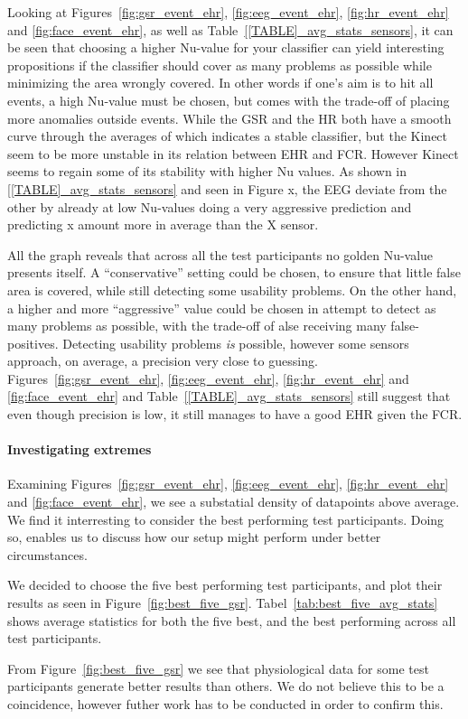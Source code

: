 Looking at Figures~\ref{fig:gsr_event_ehr}, \ref{fig:eeg_event_ehr}, \ref{fig:hr_event_ehr} and \ref{fig:face_event_ehr},
as well as Table~\ref{[TABLE]_avg_stats_sensors}, it can be seen that choosing a higher Nu-value for your classifier can yield interesting propositions if the classifier should cover as many problems as possible while minimizing the area wrongly covered.
In other words if one's aim is to hit all events, a high Nu-value must be chosen, but comes with the trade-off of placing more anomalies outside events. 
While the GSR and the HR both have a smooth curve through the averages of which indicates a stable classifier, but the Kinect seem to be more unstable in its relation between EHR and FCR. However Kinect seems to regain some of its stability with higher Nu values. As shown in \ref{[TABLE]_avg_stats_sensors} and seen in Figure x, the EEG deviate from the other by already at low Nu-values doing a very aggressive prediction and predicting x amount more in average than the X sensor.

All the graph reveals that across all the test participants no golden Nu-value presents itself. A ``conservative''
setting could be chosen, to ensure that little false area is covered, while still detecting some usability problems. On
the other hand, a higher and more ``aggressive'' value could be chosen in attempt to detect as many problems as
possible, with the trade-off of alse receiving many false-positives. Detecting usability problems \textit{is} possible,
however some sensors approach, on average, a precision very close to guessing.  Figures~\ref{fig:gsr_event_ehr},
\ref{fig:eeg_event_ehr}, \ref{fig:hr_event_ehr} and \ref{fig:face_event_ehr} and Table~\ref{[TABLE]_avg_stats_sensors}
still suggest that even though precision is low, it still manages to have a good EHR given the FCR.

\paragraph{Investigating extremes}
Examining Figures~\ref{fig:gsr_event_ehr}, \ref{fig:eeg_event_ehr}, \ref{fig:hr_event_ehr} and \ref{fig:face_event_ehr},
we see a substatial density of datapoints above average. We find it interresting to consider the best performing test
participants. Doing so, enables us to discuss how our setup might perform under better circumstances.




We decided to choose the five best performing test participants, and plot their results as seen in
Figure~\ref{fig:best_five_gsr}. Tabel~\ref{tab:best_five_avg_stats} shows average statistics for both the five best, and
the best performing across all test participants.

From Figure~\ref{fig:best_five_gsr} we see that physiological data for some test participants generate better results
than others. We do not believe this to be a coincidence, however futher work has to be conducted in order to confirm this.